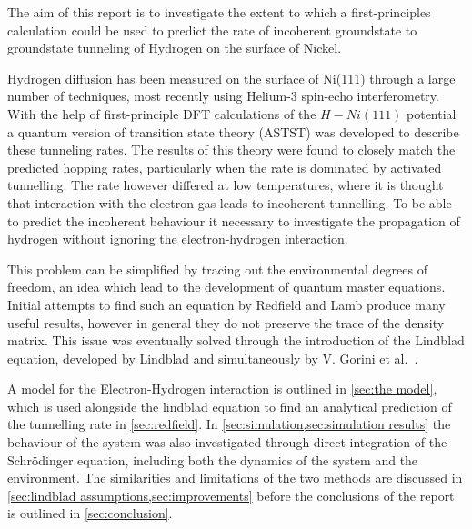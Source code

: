 

The aim of this report is to
investigate the extent to which
a first-principles calculation
could be used to predict the rate of
incoherent groundstate to
groundstate tunneling of Hydrogen
on the surface of Nickel.

Hydrogen diffusion has been measured
on the surface of Ni(111)
through a large number of
techniques\cite{LIN199141, Ni_Diffusion_Experement},
most recently
using Helium-3 spin-echo
interferometry\cite{Helium_spin_echo}.
With the help of first-principle DFT calculations of
the \(H-Ni(111)\) potential a
quantum version of transition state theory (ASTST)
was developed to describe these tunneling rates\cite{Jianding-Zhu}.
The results of this theory
were found to closely
match the predicted
hopping rates, particularly
when the rate is dominated
by activated tunnelling\cite{Jianding-Zhu}.
The rate however differed at low temperatures,
where it is thought that interaction with the
electron-gas leads to incoherent tunnelling.
To be able to predict the incoherent behaviour
it necessary to investigate
the propagation of hydrogen
without ignoring the electron-hydrogen
interaction.


This problem can be
simplified by tracing out the
environmental degrees of
freedom, an idea which lead to the
development of quantum master
equations. Initial
attempts to find such an
equation by Redfield\cite{REDFIELD19651}
and Lamb\cite{PhysRev.134.A1429} produce
many useful results, however in
general they do not preserve the
trace of the density matrix\cite{Chru_ci_ski_2017}. This
issue was eventually solved through
the introduction of the
Lindblad equation, developed
by Lindblad\cite{Lindblad1976}
and simultaneously
by V. Gorini et al.~\cite{doi:10.1063/1.522979}.



A model for the Electron-Hydrogen
interaction is outlined in
\cref{sec:the model},
which is used
alongside the
lindblad equation
to find an analytical prediction
of the tunnelling rate
in \cref{sec:redfield}.
In
\cref{sec:simulation,sec:simulation results}
the behaviour of the
system was also
investigated
through direct integration
of the
Schrödinger equation,
including both the dynamics
of the system and the environment.
The similarities and
limitations of the two
methods are discussed
in \cref{sec:lindblad assumptions,sec:improvements}
before the conclusions of
the report is
outlined in \cref{sec:conclusion}.




